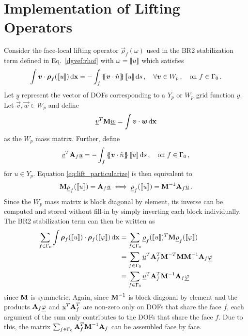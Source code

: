 \documentclass[../doc.tex]{subfiles}
\begin{document}
\section{Implementation of Lifting Operators} \label{dgvef_sec:lifting}
Consider the face-local lifting operator $\vec{\rho}_f(\omega)$ used in the BR2 stabilization term defined in Eq.~\ref{dgvef:rhof} with $\omega = \left\llbracket u \right\rrbracket$ which satisfies
	\begin{equation} \label{eq:lift_particularize}
		\int \boldsymbol{v}\cdot\boldsymbol{\rho}_f(\left\llbracket u \right\rrbracket) \mathop{}\!\mathrm{d} \boldsymbol{\mathrm{x}} = -\int_{f} \left\{\!\!\left\{\boldsymbol{v}\cdot\hat{n}\right\}\!\!\right\} \left\llbracket u \right\rrbracket \mathop{}\!\mathrm{d} s \,, \quad \forall \boldsymbol{v} \in W_p\,, \quad \text{on} \ f \in \Gamma_0 \,. 
	\end{equation}
Let $\underline{y}$ represent the vector of DOFs corresponding to a $Y_p$ or $W_p$ grid function $y$. Let $\vec{v},\vec{w} \in W_p$ and define 
	\begin{equation}
		\underline{v}^T \boldsymbol{\mathrm{M}} \underline{w} = \int \boldsymbol{v}\cdot\boldsymbol{w} \mathop{}\!\mathrm{d} \boldsymbol{\mathrm{x}} 
	\end{equation}
as the $W_p$ mass matrix. Further, define 
	\begin{equation}
		\underline{v}^T \boldsymbol{\mathrm{A}}_f \underline{u} = - \int_f \left\{\!\!\left\{\boldsymbol{v}\cdot\hat{n}\right\}\!\!\right\} \left\llbracket u \right\rrbracket \mathop{}\!\mathrm{d} s \,, \quad \text{on} \ f \in \Gamma_0 \,, 
	\end{equation}
for $u \in Y_p$. 
Equation \ref{eq:lift_particularize} is then equivalent to 
	\begin{equation}
		\boldsymbol{\mathrm{M}} \underline{\rho}_f(\left\llbracket u \right\rrbracket) = \boldsymbol{\mathrm{A}}_f \underline{u} \iff \underline{\rho}_f(\left\llbracket u \right\rrbracket) = \boldsymbol{\mathrm{M}}^{-1} \boldsymbol{\mathrm{A}}_f \underline{u} \,. 
	\end{equation}
Since the $W_p$ mass matrix is block diagonal by element, its inverse can be computed and stored without fill-in by simply inverting each block individually. The BR2 stabilization term can then be written as 
	\begin{equation}
	\begin{aligned}
		\sum_{f\in\Gamma_0}\int \boldsymbol{\rho}_f(\left\llbracket u \right\rrbracket) \cdot\boldsymbol{\rho}_f(\left\llbracket\varphi \right\rrbracket) \mathop{}\!\mathrm{d} \boldsymbol{\mathrm{x}} &= \sum_{f\in\Gamma_0}\underline{\rho}_f(\left\llbracket u \right\rrbracket)^T \boldsymbol{\mathrm{M}} \underline{\rho}_f(\left\llbracket\varphi \right\rrbracket) \\
		&= \sum_{f\in\Gamma_0}\underline{u}^T \boldsymbol{\mathrm{A}}_f^T \boldsymbol{\mathrm{M}}^{-T} \boldsymbol{\mathrm{M}} \boldsymbol{\mathrm{M}}^{-1} \boldsymbol{\mathrm{A}}_f \underline{\varphi} \\
		&= \sum_{f\in\Gamma_0}\underline{u}^T \boldsymbol{\mathrm{A}}_f^T \boldsymbol{\mathrm{M}}^{-1} \boldsymbol{\mathrm{A}}_f \underline{\varphi} 
	\end{aligned}
	\end{equation}
since $\boldsymbol{\mathrm{M}}$ is symmetric. Again, since $\boldsymbol{\mathrm{M}}^{-1}$ is block diagonal by element and the products $\boldsymbol{\mathrm{A}}_f\underline{\varphi}$ and $\underline{u}^T \boldsymbol{\mathrm{A}}_f^T$ are non-zero only on DOFs that share the face $f$, each argument of the sum only contributes to the DOFs that share the face $f$. Due to this, the matrix $\sum_{f\in\Gamma_0} \boldsymbol{\mathrm{A}}_f^T \boldsymbol{\mathrm{M}}^{-1} \boldsymbol{\mathrm{A}}_f$ can be assembled face by face. 
\end{document}
